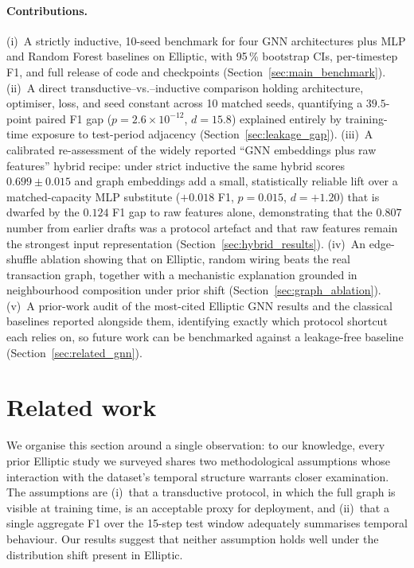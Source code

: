 \paragraph{Contributions.}  (i)~A strictly inductive, 10-seed
benchmark for four GNN architectures plus MLP and Random Forest
baselines on Elliptic, with 95\,\% bootstrap CIs, per-timestep F1,
and full release of code and checkpoints
(Section~\ref{sec:main_benchmark}).
(ii)~A direct transductive--vs.--inductive comparison holding
architecture, optimiser, loss, and seed constant across 10 matched
seeds, quantifying a $39.5$-point paired F1 gap
($p = 2.6 \times 10^{-12}$, $d = 15.8$) explained entirely by
training-time exposure to test-period adjacency
(Section~\ref{sec:leakage_gap}).
(iii)~A calibrated re-assessment of the widely reported ``GNN
embeddings plus raw features'' hybrid recipe: under strict inductive
the same hybrid scores $0.699 \pm 0.015$ and graph embeddings add a
small, statistically reliable lift over a matched-capacity MLP
substitute ($+0.018$ F1, $p = 0.015$, $d = +1.20$) that is dwarfed
by the $0.124$ F1 gap to raw features alone, demonstrating that the
$0.807$ number from earlier drafts was a protocol artefact and that
raw features remain the strongest input representation
(Section~\ref{sec:hybrid_results}).
(iv)~An edge-shuffle ablation showing that on Elliptic, random
wiring beats the real transaction graph, together with a mechanistic
explanation grounded in neighbourhood composition under prior shift
(Section~\ref{sec:graph_ablation}).
(v)~A prior-work audit of the most-cited Elliptic GNN results
and the classical baselines reported alongside them, identifying
exactly which protocol shortcut each relies on, so
future work can be benchmarked against a leakage-free baseline
(Section~\ref{sec:related_gnn}).


\section{Related work}
\label{sec:related}

We organise this section around a single observation: to our knowledge,
every prior Elliptic study we surveyed shares two methodological
assumptions whose interaction with the dataset's temporal structure
warrants closer examination.  The assumptions are (i)~that a
transductive protocol, in which the full graph is visible at training
time, is an acceptable proxy for deployment, and (ii)~that a single
aggregate F1 over the 15-step test window adequately summarises temporal
behaviour.  Our results suggest that neither assumption holds well under
the distribution shift present in Elliptic.

